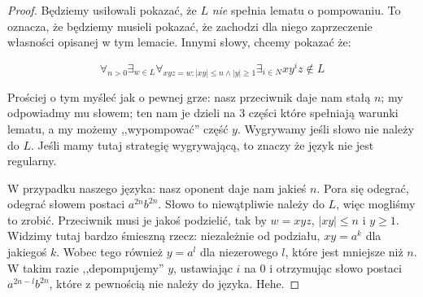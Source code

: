 \begin{proof}
	Będziemy usiłowali pokazać, że \(L\) \textit{nie} spełnia lematu o pompowaniu. To oznacza, że będziemy musieli pokazać, że zachodzi dla niego zaprzeczenie własności opisanej w tym lemacie. Innymi słowy, chcemy pokazać że:

	\[
		\forall_{n>0} \exists_{w \in L} \forall_{xyz=w : |xy| \leq n \land |y| \geq 1} \exists_{i \in N} xy^iz \not \in L
	\]

	Prościej o tym myśleć jak o pewnej grze: nasz przeciwnik daje nam stałą \(n\); my odpowiadmy mu słowem; ten nam je dzieli na 3 części które spełniają warunki lematu, a my możemy ,,wypompować'' część \(y\). Wygrywamy jeśli słowo nie należy do \(L\). Jeśli mamy tutaj strategię wygrywającą, to znaczy że język nie jest regularny.

	W przypadku naszego języka: nasz oponent daje nam jakieś \(n\). Pora się odegrać, odegrać słowem postaci \(a^{2n}b^{2n}\). Słowo to niewątpliwie należy do \(L\), więc mogliśmy to zrobić. Przeciwnik musi je jakoś podzielić, tak by \( w = xyz\), \(|xy| \leq n \) i \(y \geq 1\). Widzimy tutaj bardzo śmieszną rzecz: niezależnie od podziału, \(xy = a^k\) dla jakiegoś \(k\). Wobec tego również \(y = a^l\) dla niezerowego \(l\), które jest mniejsze niż \(n\). W takim razie ,,depompujemy'' \(y\), ustawiając \(i\) na 0 i otrzymując słowo postaci \(a^{2n-l}b^{2n}\), które z pewnością nie należy do języka. Hehe.
\end{proof}

